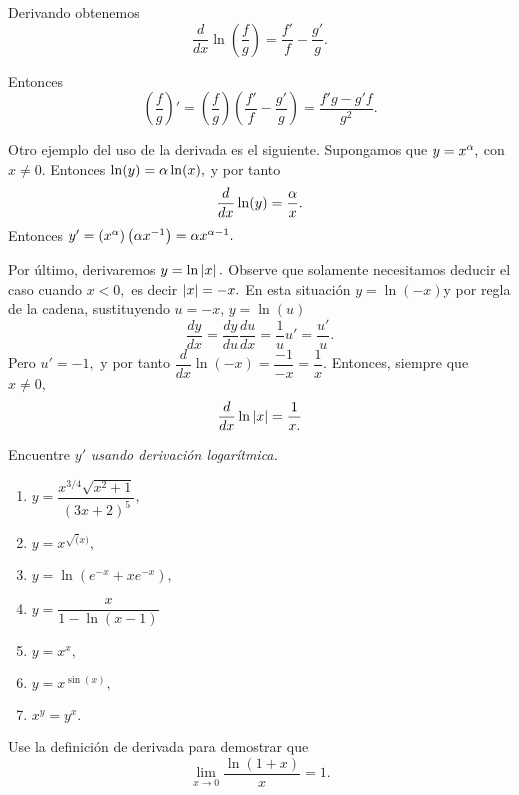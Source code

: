     Derivando obtenemos
    $$
    \dfrac{d}{dx} \ln\left( \dfrac{f}{g} \right)=\dfrac{f'}{f}-\dfrac{g'}{g}.
    $$



    Entonces
    $$\left( \dfrac{f}{g} \right)'=\left( \dfrac{f}{g} \right)\left( \dfrac{f'}{f}-\dfrac{g'}{g}
    \right)=\dfrac{f'g-g'f}{g^{2}}.
    $$



    Otro ejemplo del uso de la derivada es el siguiente. Supongamos que $y=x^{\alpha},$ con $x\neq0.$ Entonces
    $
    \ln(y)=\alpha\ln(x),
    $
    y por tanto
    $$
    \dfrac{d}{dx}\ln(y)=\dfrac{\alpha}{x}.
    $$
    Entonces
    $y'=\left( x^{\alpha} \right)\left( \alpha x^{-1} \right)=\alpha x^{\alpha-1}.$



    Por último, derivaremos $y=\ln\left|x\right|.$ Observe que solamente necesitamos deducir el caso cuando $x<0,$ es decir
    $\left|x\right|=-x.$ En esta situación $y=\ln(-x)$y por regla de la cadena, sustituyendo $u=-x, \, y=\ln(u)$
    $$
    \dfrac{dy}{dx}=\dfrac{dy}{du}\dfrac{du}{dx}=\dfrac{1}{u}u'=\dfrac{u'}{u}.$$
    Pero $u'=-1, $ y por tanto $\dfrac{d}{dx}\ln(-x)=\dfrac{-1}{-x}=\dfrac{1}{x}.$ Entonces, siempre que $x\neq 0,$
    $$
    \dfrac{d}{dx}\ln\left|x\right|=\dfrac{1}{x.}
    $$




    \begin{resuelto}
        Encuentre $y'$ \emph{usando derivación logarítmica.}
        \begin{enumerate}
            \item $y=\dfrac{x^{3/4}\sqrt{x^{2}+1}}{(3x+2)^{5}},$
            \item $y=x^{\sqrt(x)},$
            \item $y=\ln(e^{-x}+xe^{-x}),$
            \item $y=\dfrac{x}{1-\ln(x-1)}$
            \item $y=x^{x},$
            \item $y=x^{\sin(x)},$
            \item $x^{y}=y^{x}.$
        \end{enumerate}

    \end{resuelto}


    \begin{resuelto}
        Use la definición de derivada para demostrar que
        $$
        \lim_{x\to 0}\dfrac{\ln(1+x)}{x}=1.
        $$
    \end{resuelto}

